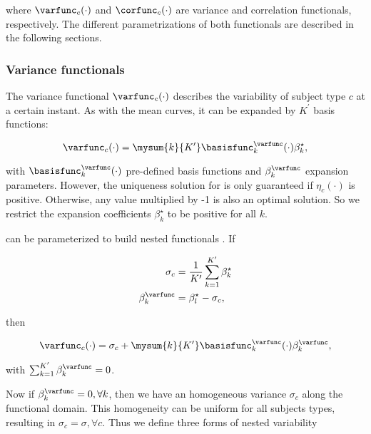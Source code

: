 \noindent where $\varfunc_c(\cdot)$ and $\corfunc_c(\cdot)$ are variance and correlation functionals, respectively. The different parametrizations of both functionals are described in the following sections.

\subsubsection{Variance functionals}
\label{sec:varfunc}

The variance functional $\varfunc_c(\cdot)$ describes the variability of subject type $c$ at a certain instant. As with the mean curves, it can be expanded by $K^\prime$ basis functions:

\begin{equation}
  \label{eq:completefunc}
  \varfunc_c(\cdot)
  =
  \mysum{k}{K^\prime}
  \basisfunc^\varfunc_k(\cdot)
  \beta_k^\star,
\end{equation}

\noindent with $\basisfunc^\varfunc_k(\cdot)$ pre-defined basis functions and $\beta_k^\varfunc$ expansion parameters. However, the uniqueness solution for  is only guaranteed if $\eta_c(\cdot)$ is positive. Otherwise, any value multiplied by -1 is also an optimal solution. So we restrict the expansion coefficients $\beta_k^\star$ to be positive for all $k$.

 can be parameterized to build nested functionals \cite{dias2013hierarchical}. If

\begin{eqnarray}
  \label{eq:nest}
  \sigma_c &= \frac{1}{K^\prime} \sum_{k=1}^{K^\prime} \beta_k^\star \\
  \beta_k^{\varfunc} &= \beta_l^\star - \sigma_c,
\end{eqnarray}

\noindent then %

\begin{equation}
  \label{eq:completefunc2}
  \varfunc_c(\cdot)
  =
  \sigma_c
  +
  \mysum{k}{K^\prime}
  \basisfunc^\varfunc_k(\cdot)
  \beta_k^\varfunc,
\end{equation}

\noindent with $\sum_{k=1}^{K^\prime} \beta_k^\varfunc = 0$. 

Now if $\beta_k^\varfunc = 0, \forall k$, then we have an homogeneous variance $\sigma_c$ along the functional domain. This homogeneity can be uniform for all subjects types, resulting in $\sigma_c = \sigma, \forall c$.  Thus we define three forms of nested variability 


